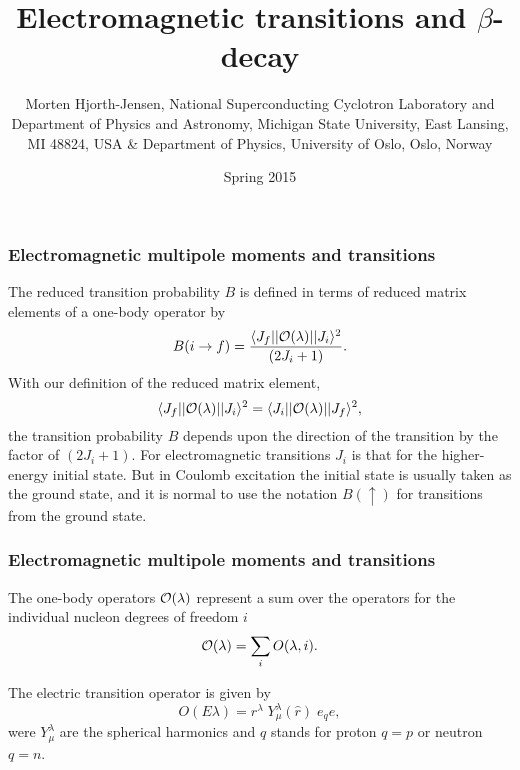 \documentclass{beamer}
\begin{document}




\title{Electromagnetic transitions and $\beta$-decay}


\author{Morten Hjorth-Jensen, National Superconducting Cyclotron Laboratory and Department of Physics and Astronomy, Michigan State University, East Lansing, MI 48824, USA {\&} Department of Physics, University of Oslo, Oslo, Norway\inst{}}
\institute{}

\date{Spring 2015
}

\begin{frame}
\titlepage
\end{frame}

\begin{frame}
\frametitle{Electromagnetic multipole moments and transitions}

\begin{block}{}
The reduced
transition probability $B$ is defined in terms of reduced matrix
elements of a one-body operator by
\[
B(i \rightarrow f)= \frac{\langle J_{f}||{\cal O}(\lambda )||J_{i}\rangle^{2}}{(2J_{i}+1)}. 
\]
With our definition of the reduced matrix element,
\[
\langle J_{f}||{\cal O}(\lambda )||J_{i}\rangle^{2} =\langle J_{i}||{\cal O}(\lambda )||J_{f}\rangle^{2},  
\]
the transition probability $B$ depends upon the direction of the transition by the factor
of $(2J_{i}+1)$. For electromagnetic
transitions $J_{i}$ is that for the higher-energy initial state. But in
Coulomb excitation the initial state is usually
taken as the ground state, and it is normal to use the notation $B(\uparrow)$ for transitions from the ground state.
\end{block}
\end{frame}

\begin{frame}
\frametitle{Electromagnetic multipole moments and transitions}

\begin{block}{}
The one-body operators $  {\cal O}(\lambda )  $ represent a sum over
the operators for the individual nucleon degrees of freedom  $  i  $
\[
{\cal O}(\lambda ) = \sum_{i} O(\lambda ,i). 
\]

The electric transition operator is given by
\[
O(E\lambda ) = r^{\lambda } \; Y^{\lambda }_{\mu }(\hat{r}) \; e_{q} e, 
\]
were $Y^{\lambda }_{\mu }$ are the spherical harmonics
and $q$ stands for proton $q=p$ or neutron $q=n$.

\end{block}
\end{frame}
\end{document}
